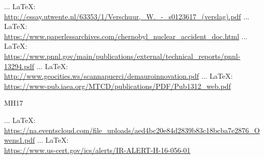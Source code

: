 \begin{thebibliography}{99}
{{{{{{{%
%						
%						
						 ... \LaTeX:\\ \url{http://essay.utwente.nl/63353/1/Verschuur,_W._-_s0123617_(verslag).pdf}
						 ... \LaTeX:\\ \url{https://www.paperlessarchives.com/chernobyl_nuclear_accident_doc.html}
						 ... \LaTeX:\\ \url{https://www.pnnl.gov/main/publications/external/technical_reports/pnnl-13294.pdf}
						 ... \LaTeX:\\ \url{http://www.geocities.ws/scannapuerci/demauroinnovation.pdf}
						 ... \LaTeX:\\ \url{https://www-pub.iaea.org/MTCD/publications/PDF/Pub1312_web.pdf}
						
						
						
						
						MH17
						
						
						
						
						 ... \LaTeX:\\ \url{https://na.eventscloud.com/file_uploads/aed4bc20e84d2839b83c18bcba7e2876_Owens1.pdf}
						 ... \LaTeX:\\ \url{https://www.us-cert.gov/ics/alerts/IR-ALERT-H-16-056-01}
						
}}}}}}}
\end{thebibliography}
